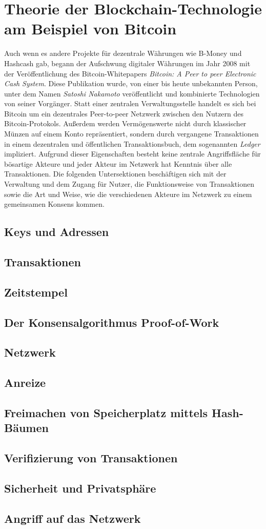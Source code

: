 \section{Theorie der Blockchain-Technologie am Beispiel von Bitcoin}
Auch wenn es andere Projekte für dezentrale Währungen wie B-Money und Hashcash gab, begann der Aufschwung digitaler Währungen im Jahr 2008 mit der Veröffentlichung des Bitcoin-Whitepapers \emph{Bitcoin: A Peer to peer Electronic Cash System}. Diese Publikation wurde, von einer bis heute unbekannten Person, unter dem Namen \emph{Satoshi Nakamoto} veröffentlicht und kombinierte Technologien von seiner Vorgänger. Statt einer zentralen Verwaltungsstelle handelt es sich bei Bitcoin um ein dezentrales Peer-to-peer Netzwerk zwischen den Nutzern des Bitcoin-Protokols. Außerdem werden Vermögenswerte nicht durch klassischer Münzen auf einem Konto repräsentiert, sondern durch vergangene Transaktionen in einem dezentralen und öffentlichen Transaktionsbuch, dem sogenannten \emph{Ledger} impliziert. Aufgrund dieser Eigenschaften besteht keine zentrale Angriffsfläche für bösartige Akteure und jeder Akteur im Netzwerk hat Kenntnis über alle Transaktionen. Die folgenden Untersektionen beschäftigen sich mit der Verwaltung und dem Zugang für Nutzer, die Funktionsweise von Transaktionen sowie die Art und Weise, wie die verschiedenen Akteure im Netzwerk zu einem gemeinsamen Konsens kommen.
\subsection{Keys und Adressen}
\subsection{Transaktionen}
\subsection{Zeitstempel}
\subsection{Der Konsensalgorithmus Proof-of-Work}
\subsection{Netzwerk}
\subsection{Anreize}
\subsection{Freimachen von Speicherplatz mittels Hash-Bäumen}
\subsection{Verifizierung von Transaktionen}
\subsection{Sicherheit und Privatsphäre}
\subsection{Angriff auf das Netzwerk}

